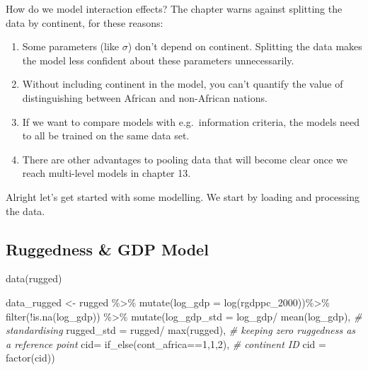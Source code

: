 \documentclass[
]{book}
\newenvironment{Shaded}{\begin{snugshade}}{\end{snugshade}}
\newcommand{\AttributeTok}[1]{\textcolor[rgb]{0.77,0.63,0.00}{#1}}
\newcommand{\CommentTok}[1]{\textcolor[rgb]{0.56,0.35,0.01}{\textit{#1}}}
\newcommand{\DecValTok}[1]{\textcolor[rgb]{0.00,0.00,0.81}{#1}}
\newcommand{\FunctionTok}[1]{\textcolor[rgb]{0.00,0.00,0.00}{#1}}
\newcommand{\NormalTok}[1]{#1}
\newcommand{\OtherTok}[1]{\textcolor[rgb]{0.56,0.35,0.01}{#1}}
\newcommand{\SpecialCharTok}[1]{\textcolor[rgb]{0.00,0.00,0.00}{#1}}
\providecommand{\tightlist}{%
  \setlength{\itemsep}{0pt}\setlength{\parskip}{0pt}}
\begin{document}
How do we model interaction effects? The chapter warns against splitting the data by continent, for these reasons:

\begin{enumerate}
\def\labelenumi{\arabic{enumi}.}
\tightlist
\item
  Some parameters (like \(\sigma\)) don't depend on continent. Splitting the data makes the model less confident about these parameters unnecessarily.
\item
  Without including continent in the model, you can't quantify the value of distinguishing between African and non-African nations.
\item
  If we want to compare models with e.g.~information criteria, the models need to all be trained on the same data set.
\item
  There are other advantages to pooling data that will become clear once we reach multi-level models in chapter 13.
\end{enumerate}

Alright let's get started with some modelling. We start by loading and processing the data.

\hypertarget{ruggedness-gdp-model}{%
\subsection*{Ruggedness \& GDP Model}\label{ruggedness-gdp-model}}

\begin{Shaded}
\begin{Highlighting}[]
\FunctionTok{data}\NormalTok{(rugged) }

\NormalTok{data\_rugged }\OtherTok{\textless{}{-}}\NormalTok{ rugged }\SpecialCharTok{\%\textgreater{}\%}
  \FunctionTok{mutate}\NormalTok{(}\AttributeTok{log\_gdp =} \FunctionTok{log}\NormalTok{(rgdppc\_2000))}\SpecialCharTok{\%\textgreater{}\%}
  \FunctionTok{filter}\NormalTok{(}\SpecialCharTok{!}\FunctionTok{is.na}\NormalTok{(log\_gdp)) }\SpecialCharTok{\%\textgreater{}\%}
  \FunctionTok{mutate}\NormalTok{(}\AttributeTok{log\_gdp\_std =}\NormalTok{ log\_gdp}\SpecialCharTok{/} \FunctionTok{mean}\NormalTok{(log\_gdp), }\CommentTok{\# standardising}
         \AttributeTok{rugged\_std =}\NormalTok{ rugged}\SpecialCharTok{/} \FunctionTok{max}\NormalTok{(rugged), }\CommentTok{\# keeping zero ruggedness as a reference point}
         \AttributeTok{cid=} \FunctionTok{if\_else}\NormalTok{(cont\_africa}\SpecialCharTok{==}\DecValTok{1}\NormalTok{,}\DecValTok{1}\NormalTok{,}\DecValTok{2}\NormalTok{), }\CommentTok{\# continent ID}
         \AttributeTok{cid =} \FunctionTok{factor}\NormalTok{(cid))}
\end{Highlighting}
\end{Shaded}
\end{document}

